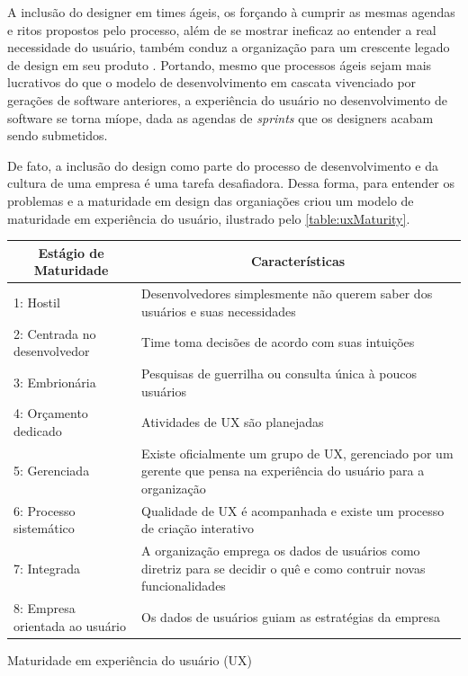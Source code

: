A inclusão do designer em times ágeis, os forçando à cumprir as mesmas agendas e ritos propostos pelo processo, além de se mostrar ineficaz ao entender a real necessidade do usuário, também conduz a organização para um crescente legado de design em seu produto \cite{ruissalo2018operating}. Portando, mesmo que processos ágeis sejam mais lucrativos do que o modelo de desenvolvimento em cascata vivenciado por gerações de software anteriores, a experiência do usuário no desenvolvimento de software se torna míope, dada as agendas de \textit{sprints} que os designers acabam sendo submetidos.

De fato, a inclusão do design como parte do processo de desenvolvimento e da cultura de uma empresa é uma tarefa desafiadora. Dessa forma, para entender os problemas e a maturidade em design das organiações \cite{nielsen1994usability} criou um modelo de maturidade em experiência do usuário, ilustrado pelo \autoref{table:uxMaturity}.

\begin{quadro}[!htb]
\centering
\begin{tabular}{|m{5cm}|m{9cm}|} \hline
	
	\multicolumn{1}{|c|}{\bfseries Estágio de Maturidade} & \multicolumn{1}{c|}{\bfseries Características} \\\hline
	
	 1: Hostil & Desenvolvedores simplesmente não querem saber dos usuários e suas necessidades \\\hline
	 
	 2: Centrada no desenvolvedor & Time toma decisões de acordo com suas intuições \\\hline
	 
	 3: Embrionária & Pesquisas de guerrilha ou consulta única à poucos usuários \\\hline
	 
	 4: Orçamento dedicado & Atividades de UX são planejadas \\\hline
	 
	 5: Gerenciada & Existe oficialmente um grupo de UX, gerenciado por um gerente que pensa na experiência do usuário para a organização \\\hline
	 
	 6: Processo sistemático & Qualidade de UX é acompanhada e existe um processo de criação interativo \\\hline
	 
	 7: Integrada & A organização emprega os dados de usuários como diretriz para se decidir o quê e como contruir novas funcionalidades \\\hline
	 
	 8: Empresa orientada ao usuário & Os dados de usuários guiam as estratégias da empresa \\\hline
    
\end{tabular}
\caption{Maturidade em experiência do usuário (UX)}
\label{table:uxMaturity}
\end{quadro}

